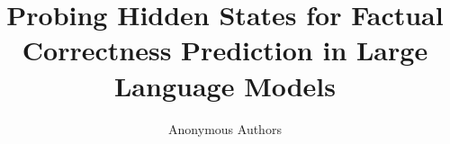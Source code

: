 \documentclass[letterpaper]{article}
\title{Probing Hidden States for Factual Correctness Prediction in Large Language Models}
\author{Anonymous Authors}
\date{}
\begin{document}
\maketitle

\begin{abstract}

\end{abstract}











\end{document}
